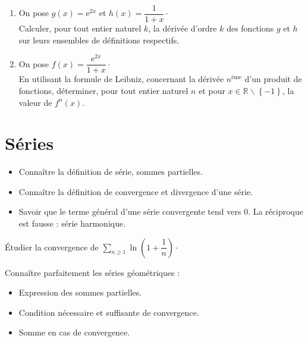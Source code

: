\documentclass[a4paper,twoside,french,11pt]{VcCours}
\begin{document}
\begin{Exercice}{}
\end{Exercice} 
\begin{enumerate}
\item
On pose $g(x)=\mathrm{e}^{2x}$ et $h(x)=\dfrac{1}{1+x} \cdot$\\
Calculer, pour tout entier naturel $k$, la dérivée d'ordre $k$ des fonctions $g$ et $h$ sur leurs ensembles de définitions respectifs.
\item 
On pose $f(x)=\dfrac{\mathrm{e}^{2x}}{1+x}\cdot$\\
En utilisant la formule de Leibniz, concernant la dérivée $n^{\text{ème}}$ d'un produit de fonctions, déterminer, pour tout entier naturel $n$ et pour $x\in\mathbb{R}\backslash\left\lbrace -1\right\rbrace $, la valeur de $f^{n}(x)$.
\end{enumerate}

\section{Séries}

\begin{ptc}{}

\begin{itemize}
\item Connaître la définition de série, sommes partielles.
\item Connaître la définition de convergence et divergence d'une série.
\item Savoir que le terme général d'une série convergente tend vers $0$. La réciproque est fausse : série harmonique.
\end{itemize}
\end{ptc}

\begin{Exercice}{}
  Étudier la convergence de $\sum_{n \geq 1} \ln \left( 1 + \dfrac{1}{n} \right) \cdot$
\end{Exercice} 

\begin{ptc}{}
	Connaître parfaitement les séries géométriques :
\begin{itemize}
\item Expression des sommes partielles.
\item Condition nécessaire et suffisante de convergence.
\item Somme en cas de convergence.
\end{itemize}
\end{ptc}
\end{document}
